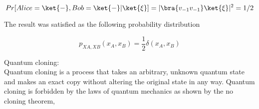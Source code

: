 \documentclass[xelatex,ja=standard,jafont=noto]{bxjsarticle}
\begin{document}
\begin{equation}
    Pr[Alice=\ket{-},Bob=\ket{-}|\ket{\xi}]=|\bra{v_{-1}v_{-1}}\ket{\xi}|^{2}=1/2
\end{equation}

The result was satisfied as the following probability distribution

\begin{equation}
    p_{XA,XB}(x_{A},x_{B})=\frac{1}{2}\delta(x_{A},x_{B})
\end{equation}


Quantum cloning:\\

Quantum cloning is a process that takes an arbitrary, unknown quantum state and makes an exact copy without altering the original state in any way. Quantum cloning is forbidden by the laws of quantum mechanics as shown by the no cloning theorem,
\end{document}
